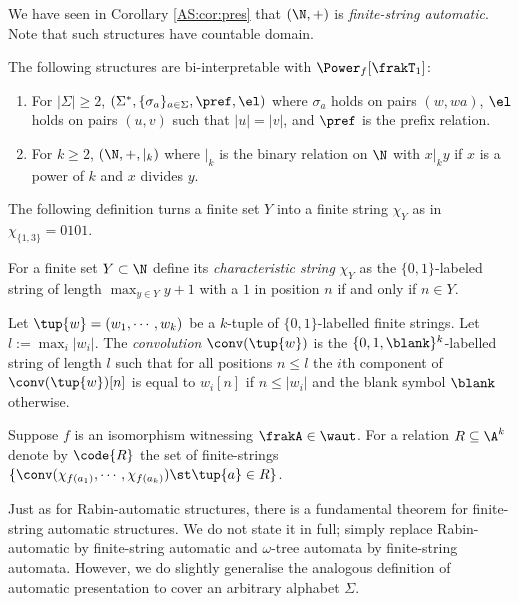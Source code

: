 We have seen in Corollary \ref{AS:cor:pres} that $(\N,+)$ is {\em finite-string automatic}. 
Note that such structures have countable domain. 

\begin{example}
The following structures are bi-interpretable with $\Power_f[\frakT_1]$:
\begin{enumerate} 
\item For $|\Sigma| \geq 2$, $(\Sigma^\ast,\{\sigma_a\}_{a \in \Sigma},\pref,\el)$ 
where $\sigma_a$ holds on pairs $(w,wa)$, $\el$ holds on pairs $(u,v)$ such that $|u|=|v|$, and $\pref$ is the prefix relation.
\item For $k \geq 2$, $(\N,+,|_k)$
where $|_k$ is the binary relation on $\N$ with $x |_k y$ if $x$ is a power of $k$ and $x$ divides $y$.
\end{enumerate}
\end{example}

The following definition turns a finite set $Y$ into a finite string $\chi_Y$ as in $\chi_{\{1,3\}} = 0101$.

\begin{definition}
For a finite set $Y \subset \N$ define
its {\em characteristic string} $\chi_Y$ as the $\{0,1\}$-labeled string of length $\max_{y \in Y} y + 1$ with a $1$ in position $n$ if and only if $n \in Y$.
\end{definition}


\begin{definition}
Let $\tup{w} = (w_1,\cdots,w_k)$
be a $k$-tuple of $\{0,1\}$-labelled finite strings. Let $l:= \max_i |w_i|$.
The {\em convolution} $\conv(\tup{w})$ is the $\{0,1,\blank\}^k$-labelled string of length $l$ such that for all positions $n \leq l$
the $i$th component of $\conv(\tup{w})[n]$ is equal to $w_i[n]$ if $n \leq |w_i|$ and the blank symbol $\blank$ otherwise.
\end{definition} 


\begin{definition}
Suppose $f$ is an isomorphism witnessing $\frakA \in \waut$. For a relation $R \subseteq \A^k$ denote by
$\code{R}$ the set of finite-strings  $\{\conv(\chi_{f(a_1)},\cdots,\chi_{f(a_k)}) \st  \tup{a} \in R\}$. 
\end{definition}

Just as for Rabin-automatic structures, there is a fundamental theorem for finite-string automatic structures. We do not state it in full;
simply replace Rabin-automatic by finite-string automatic and $\omega$-tree automata by finite-string automata.
However, we do slightly generalise the analogous definition of automatic presentation to cover an arbitrary alphabet $\Sigma$.


